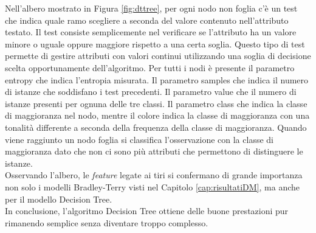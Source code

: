 Nell'albero mostrato in Figura \ref{fig:dttree}, per ogni nodo non foglia c'è un test che indica quale ramo scegliere a seconda del valore contenuto nell'attributo testato. Il test consiste semplicemente nel verificare se l'attributo ha un valore minore o uguale oppure maggiore rispetto a una certa soglia. Questo tipo di test permette di gestire attributi con valori continui utilizzando una soglia di decisione scelta opportunamente dell'algoritmo. Per tutti i nodi è presente il parametro \textsf{entropy} che indica l'entropia misurata. Il parametro \textsf{samples} che indica il numero di istanze che soddisfano i test precedenti. Il parametro \textsf{value} che il numero di istanze presenti per ognuna delle tre classi. Il parametro \textsf{class} che indica la classe di maggioranza nel nodo, mentre il colore indica la classe di maggioranza con una tonalità differente a seconda della frequenza della classe di maggioranza. Quando viene raggiunto un nodo foglia si classifica l'osservazione con la classe di maggioranza dato che non ci sono più attributi che permettono di distinguere le istanze.\\
Osservando l'albero, le \emph{feature} legate ai tiri si confermano di grande importanza non solo i modelli Bradley-Terry visti nel Capitolo \ref{cap:risultatiDM}, ma anche per il modello Decision Tree.\\
In conclusione, l'algoritmo Decision Tree ottiene delle buone prestazioni pur rimanendo semplice senza diventare troppo complesso.

